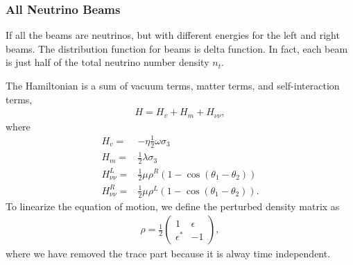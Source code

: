 \documentclass[letterpaper,12pt,english]{sphinxmanual}
\begin{document}
\subsubsection{All Neutrino Beams}
\label{\detokenize{collective/some-clarifications:all-neutrino-beams}}
If all the beams are neutrinos, but with different energies for the left and right beams. The distribution function for beams is delta function. In fact, each beam is just half of the total neutrino number density \(n_t\).

The Hamiltonian is a sum of vacuum terms, matter terms, and self-interaction terms,
\begin{equation*}
\begin{split}H= H_v + H_m + H_{\nu\nu},\end{split}
\end{equation*}
where
\begin{equation*}
\begin{split}H_v =& - \eta \frac{1}{2}\omega \sigma_3 \\
H_m =& \frac{1}{2}\lambda \sigma_3\\
H_{\nu\nu}^L =& \frac{1}{2}\mu \rho^R (1-\cos(\theta_1-\theta_2))\\
H_{\nu\nu}^R =& \frac{1}{2}\mu \rho^L (1-\cos(\theta_1-\theta_2)).\end{split}
\end{equation*}
To linearize the equation of motion, we define the perturbed density matrix as
\begin{equation*}
\begin{split}\rho = \frac{1}{2}\begin{pmatrix}
1 & \epsilon\\
\epsilon^* & -1
\end{pmatrix},\end{split}
\end{equation*}
where we have removed the trace part because it is alway time independent.
\end{document}
